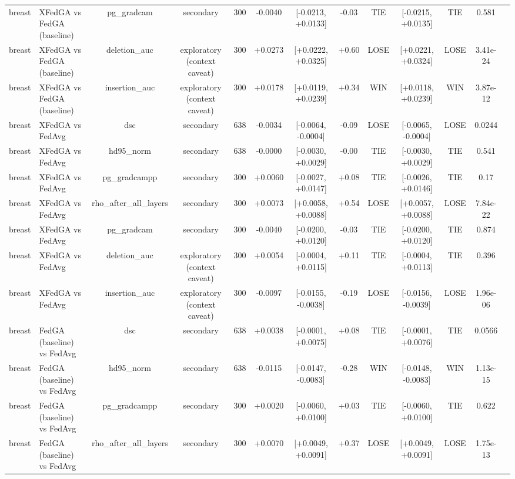 \begin{tabular}{llccccccccccc}
breast & XFedGA vs FedGA (baseline) & pg\_gradcam & secondary & 300 & -0.0040 & [-0.0213, +0.0133] & -0.03 & TIE & [-0.0215, +0.0135] & TIE & 0.581 &  \\
breast & XFedGA vs FedGA (baseline) & deletion\_auc & exploratory (context caveat) & 300 & +0.0273 & [+0.0222, +0.0325] & +0.60 & LOSE & [+0.0221, +0.0324] & LOSE & 3.41e-24 &  \\
breast & XFedGA vs FedGA (baseline) & insertion\_auc & exploratory (context caveat) & 300 & +0.0178 & [+0.0119, +0.0239] & +0.34 & WIN & [+0.0118, +0.0239] & WIN & 3.87e-12 &  \\
breast & XFedGA vs FedAvg & dsc & secondary & 638 & -0.0034 & [-0.0064, -0.0004] & -0.09 & LOSE & [-0.0065, -0.0004] & LOSE & 0.0244 &  \\
breast & XFedGA vs FedAvg & hd95\_norm & secondary & 638 & -0.0000 & [-0.0030, +0.0029] & -0.00 & TIE & [-0.0030, +0.0029] & TIE & 0.541 &  \\
breast & XFedGA vs FedAvg & pg\_gradcampp & secondary & 300 & +0.0060 & [-0.0027, +0.0147] & +0.08 & TIE & [-0.0026, +0.0146] & TIE & 0.17 &  \\
breast & XFedGA vs FedAvg & rho\_after\_all\_layers & secondary & 300 & +0.0073 & [+0.0058, +0.0088] & +0.54 & LOSE & [+0.0057, +0.0088] & LOSE & 7.84e-22 &  \\
breast & XFedGA vs FedAvg & pg\_gradcam & secondary & 300 & -0.0040 & [-0.0200, +0.0120] & -0.03 & TIE & [-0.0200, +0.0120] & TIE & 0.874 &  \\
breast & XFedGA vs FedAvg & deletion\_auc & exploratory (context caveat) & 300 & +0.0054 & [-0.0004, +0.0115] & +0.11 & TIE & [-0.0004, +0.0113] & TIE & 0.396 &  \\
breast & XFedGA vs FedAvg & insertion\_auc & exploratory (context caveat) & 300 & -0.0097 & [-0.0155, -0.0038] & -0.19 & LOSE & [-0.0156, -0.0039] & LOSE & 1.96e-06 &  \\
breast & FedGA (baseline) vs FedAvg & dsc & secondary & 638 & +0.0038 & [-0.0001, +0.0075] & +0.08 & TIE & [-0.0001, +0.0076] & TIE & 0.0566 &  \\
breast & FedGA (baseline) vs FedAvg & hd95\_norm & secondary & 638 & -0.0115 & [-0.0147, -0.0083] & -0.28 & WIN & [-0.0148, -0.0083] & WIN & 1.13e-15 &  \\
breast & FedGA (baseline) vs FedAvg & pg\_gradcampp & secondary & 300 & +0.0020 & [-0.0060, +0.0100] & +0.03 & TIE & [-0.0060, +0.0100] & TIE & 0.622 &  \\
breast & FedGA (baseline) vs FedAvg & rho\_after\_all\_layers & secondary & 300 & +0.0070 & [+0.0049, +0.0091] & +0.37 & LOSE & [+0.0049, +0.0091] & LOSE & 1.75e-13 &  \\

\end{tabular}
